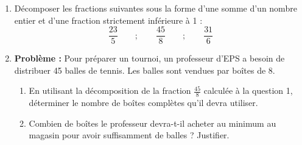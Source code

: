 \documentclass[a4paper]{book}
\begin{document}
    
    \begin{exercice}
        \begin{enumerate}
            \item Décomposer les fractions suivantes sous la forme d'une somme d'un nombre entier et d'une fraction strictement inférieure à 1 :
            \[ \frac{23}{5} \qquad ; \qquad \frac{45}{8} \qquad ; \qquad \frac{31}{6} \]
            \item \textbf{Problème :} Pour préparer un tournoi, un professeur d'EPS a besoin de distribuer 45 balles de tennis. Les balles sont vendues par boîtes de 8.
            \begin{enumerate}
                \item En utilisant la décomposition de la fraction $\frac{45}{8}$ calculée à la question 1, déterminer le nombre de boîtes complètes qu'il devra utiliser.
                \item Combien de boîtes le professeur devra-t-il acheter au minimum au magasin pour avoir suffisamment de balles ? Justifier.
            \end{enumerate}
        \end{enumerate}
    \end{exercice}
\end{document}
